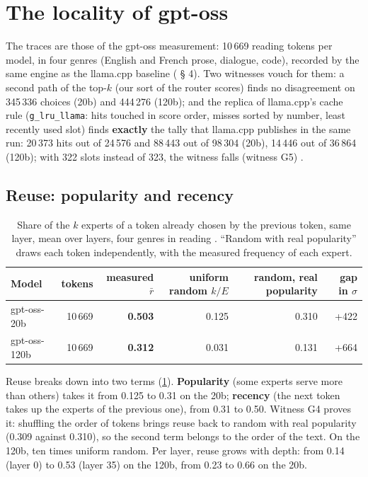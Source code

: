 \section{The locality of gpt-oss}\label{sec:t2o-localite}

The traces are those of the gpt-oss measurement: 10\,669 reading tokens per model, in four genres (English and French prose, dialogue, code), recorded by the same engine as the llama.cpp baseline ( § 4). Two witnesses vouch for them: a second path of the top-$k$ (our sort of the router scores) finds no disagreement on 345\,336 choices (20b) and 444\,276 (120b); and the replica of llama.cpp's cache rule (\texttt{g\_lru\_llama}: hits touched in score order, misses sorted by number, least recently used slot) finds \textbf{exactly} the tally that llama.cpp publishes in the same run: 20\,373 hits out of 24\,576 and 88\,443 out of 98\,304 (20b), 14\,446 out of 36\,864 (120b); with 322 slots instead of 323, the witness falls (witness G5) \mes.

\subsection{Reuse: popularity and recency}

\begin{table}[ht]
\centering\small
\caption[Reuse from one token to the next]{Share of the $k$ experts of a token already chosen by the previous token, same layer, mean over layers, four genres in reading \mes. \enquote{Random with real popularity} draws each token independently, with the measured frequency of each expert.}
\label{tab:t2o-reutilisation}
\begin{tabular}{@{}lrrrrr@{}}
\toprule
Model & tokens & measured $\bar r$ & uniform random $k/E$ & random, real popularity & gap in $\sigma$ \\
\midrule
gpt-oss-20b & 10\,669 & \textbf{0.503} & 0.125 & 0.310 & +422 \\
gpt-oss-120b & 10\,669 & \textbf{0.312} & 0.031 & 0.131 & +664 \\
\bottomrule
\end{tabular}
\end{table}

Reuse breaks down into two terms (\cref{tab:t2o-reutilisation}). \textbf{Popularity} (some experts serve more than others) takes it from 0.125 to 0.31 on the 20b; \textbf{recency} (the next token takes up the experts of the previous one), from 0.31 to 0.50. Witness G4 proves it: shuffling the order of tokens brings reuse back to random with real popularity (0.309 against 0.310), so the second term belongs to the order of the text. On the 120b, ten times uniform random. Per layer, reuse grows with depth: from 0.14 (layer 0) to 0.53 (layer 35) on the 120b, from 0.23 to 0.66 on the 20b.

